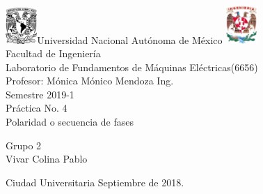

     \begin{center}
	\includegraphics[width=0.09\textwidth]{UNAM}\Large Universidad Nacional Autónoma de México
        	\includegraphics[width=0.09\textwidth]{FI}\\[2cm]
        \Large Facultad de Ingeniería\\[2cm]
         \Large Laboratorio de Fundamentos de Máquinas Eléctricas(6656)\\[2cm]
         \footnotesize Profesor: 
         Mónica Mónico Mendoza Ing.\\[2cm]
        \footnotesize Semestre 2019-1\\[2cm]
        
       

        \Large Práctica No. 4\\[2cm]
        
           

\Large Polaridad o secuencia de fases
        
          \begin{flushright}
\footnotesize  Grupo 2\\[1cm]
\footnotesize Vivar Colina Pablo\\[0.5cm]
 \end{flushright}
          \begin{flushleft}
        \footnotesize Ciudad Universitaria Septiembre de 2018.\\
          \end{flushleft}
         
          
   \end{center}
